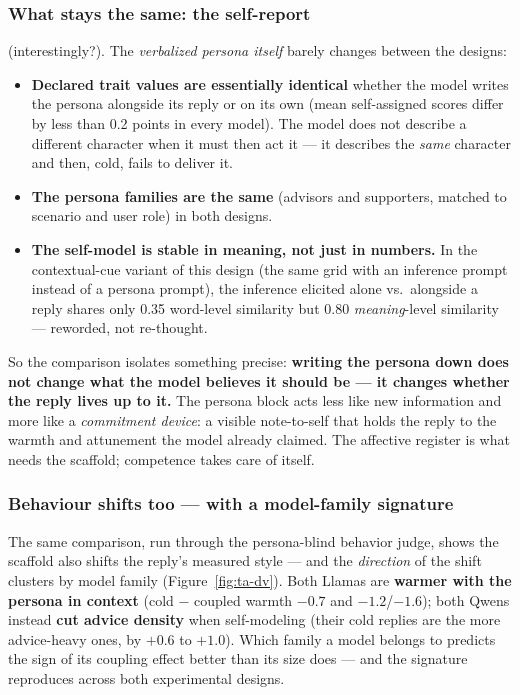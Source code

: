 \documentclass[11pt]{article}
\begin{document}
\subsubsection{What stays the same: the self-report}

(interestingly?). The
\emph{verbalized persona itself} barely changes between the designs:

\begin{itemize}
  \item \textbf{Declared trait values are essentially identical} whether the
        model writes the persona alongside its reply or on its own (mean
        self-assigned scores differ by less than 0.2 points in every model).
        The model does not describe a different character when it must then
        act it --- it describes the \emph{same} character and then, cold,
        fails to deliver it.
  \item \textbf{The persona families are the same} (advisors and supporters,
        matched to scenario and user role) in both designs.
  \item \textbf{The self-model is stable in meaning, not just in numbers.}
        In the contextual-cue variant of this design (the same grid with an
        inference prompt instead of a persona prompt), the inference elicited
        alone vs.\ alongside a reply shares only 0.35 word-level similarity
        but 0.80 \emph{meaning}-level similarity --- reworded, not re-thought.
\end{itemize}

So the comparison isolates something precise: \textbf{writing the persona
down does not change what the model believes it should be --- it changes
whether the reply lives up to it.} The persona block acts less like new
information and more like a \emph{commitment device}: a visible note-to-self
that holds the reply to the warmth and attunement the model already claimed.
The affective register is what needs the scaffold; competence takes care of
itself.

\subsubsection{Behaviour shifts too --- with a model-family signature}

The same comparison, run through the persona-blind behavior judge, shows the
scaffold also shifts the reply's measured style --- and the \emph{direction}
of the shift clusters by model family (Figure~\ref{fig:ta-dv}). Both Llamas
are \textbf{warmer with the persona in context} (cold $-$ coupled warmth
$-0.7$ and $-1.2$/$-1.6$); both Qwens instead \textbf{cut advice density}
when self-modeling (their cold replies are the more advice-heavy ones, by
$+0.6$ to $+1.0$). Which family a model belongs to predicts the sign of its
coupling effect better than its size does --- and the signature reproduces
across both experimental designs.
\end{document}
